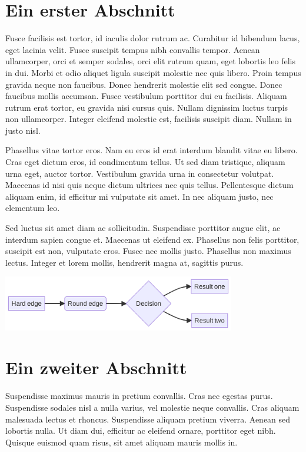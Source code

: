 \documentclass[
  12pt,
  a4paperpaper,
  a4paper]{scrreprt}
\begin{document}
\section{Ein erster Abschnitt}\label{ein-erster-abschnitt}

Fusce facilisis est tortor, id iaculis dolor rutrum ac. Curabitur id
bibendum lacus, eget lacinia velit. Fusce suscipit tempus nibh convallis
tempor. Aenean ullamcorper, orci et semper sodales, orci elit rutrum
quam, eget lobortis leo felis in dui. Morbi et odio aliquet ligula
suscipit molestie nec quis libero. Proin tempus gravida neque non
faucibus. Donec hendrerit molestie elit sed congue. Donec faucibus
mollis accumsan. Fusce vestibulum porttitor dui eu facilisis. Aliquam
rutrum erat tortor, eu gravida nisi cursus quis. Nullam dignissim luctus
turpis non ullamcorper. Integer eleifend molestie est, facilisis
suscipit diam. Nullam in justo nisl.

Phasellus vitae tortor eros. Nam eu eros id erat interdum blandit vitae
eu libero. Cras eget dictum eros, id condimentum tellus. Ut sed diam
tristique, aliquam urna eget, auctor tortor. Vestibulum gravida urna in
consectetur volutpat. Maecenas id nisi quis neque dictum ultrices nec
quis tellus. Pellentesque dictum aliquam enim, id efficitur mi vulputate
sit amet. In nec aliquam justo, nec elementum leo.

Sed luctus sit amet diam ac sollicitudin. Suspendisse porttitor augue
elit, ac interdum sapien congue et. Maecenas ut eleifend ex. Phasellus
non felis porttitor, suscipit est non, vulputate eros. Fusce nec mollis
justo. Phasellus non maximus lectus. Integer et lorem mollis, hendrerit
magna at, sagittis purus.

\includegraphics[width=4in,height=0.95in]{chapters/01-introduction_files/figure-latex/mermaid-figure-1.png}

\section{Ein zweiter Abschnitt}\label{ein-zweiter-abschnitt}

Suspendisse maximus mauris in pretium convallis. Cras nec egestas purus.
Suspendisse sodales nisl a nulla varius, vel molestie neque convallis.
Cras aliquam malesuada lectus et rhoncus. Suspendisse aliquam pretium
viverra. Aenean sed lobortis nulla. Ut diam dui, efficitur ac eleifend
ornare, porttitor eget nibh. Quisque euismod quam risus, sit amet
aliquam mauris mollis in.
\end{document}
